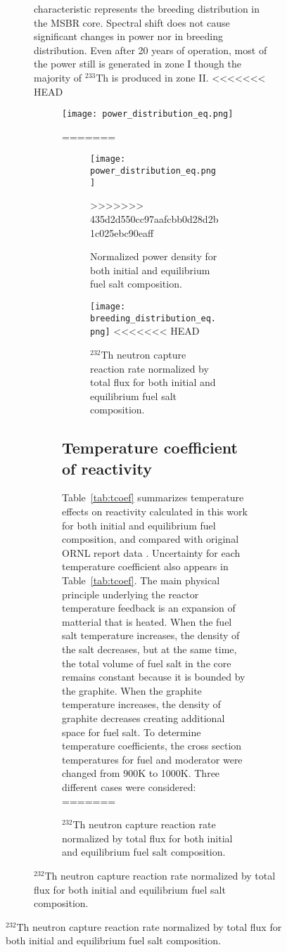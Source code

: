 \begin{figure}[htp!]
\begin{figure}[ht!]
characteristic represents the breeding distribution in the \gls{MSBR} core. 
Spectral shift does not cause significant changes in power nor in breeding 
distribution. Even after 20 years of operation, most of the power still is 
generated in zone I though the majority of $^{233}$Th is produced in zone II.
<<<<<<< HEAD
\begin{figure}[ht!] %
  \centering
  \texttt{[image: power\_distribution\_eq.png]} 
  \caption{Normalized power density for both initial and equilibrium fuel salt 
composition.}
=======
\begin{figure}[ht!] %
  \texttt{[image: power\_distribution\_eq.png]} 
  \caption{Normalized power density for both initial and equilibrium fuel salt 
  composition.}
>>>>>>> 435d2d550cc97aafcbb0d28d2b1c025ebc90eaff
  \label{fig:pow_den}
\end{figure}
\begin{figure}[ht!] %
  \texttt{[image: breeding\_distribution\_eq.png]} 
<<<<<<< HEAD
  \caption{$^{232}$Th neutron capture reaction rate normalized by total flux for 
both initial and equilibrium fuel salt composition.}
  \label{fig:breeding_den}
\end{figure}
\subsection{Temperature coefficient of reactivity}
Table~\ref{tab:tcoef} summarizes temperature effects on reactivity calculated in 
this work for both initial and equilibrium fuel composition, and compared with 
original \gls{ORNL} report data \cite{robertson_conceptual_1971}. Uncertainty 
for each temperature coefficient also appears in Table~\ref{tab:tcoef}. The main 
physical principle underlying the reactor temperature feedback is an expansion 
of matterial that is heated. When the fuel salt temperature increases, the 
density of the salt decreases, but at the same time, the total volume of fuel 
salt in the core remains constant because it is bounded by the graphite. When 
the graphite temperature increases, the density of graphite decreases creating 
additional space for fuel salt. To determine temperature coefficients, the cross 
section temperatures for fuel and moderator were changed from 900K to 1000K. 
Three different cases were considered:
=======
  \caption{$^{232}$Th neutron capture reaction rate normalized by total flux 
  for both initial and equilibrium fuel salt composition.}
  \label{fig:breeding_den}
\end{figure}

\end{figure}
\end{figure}
